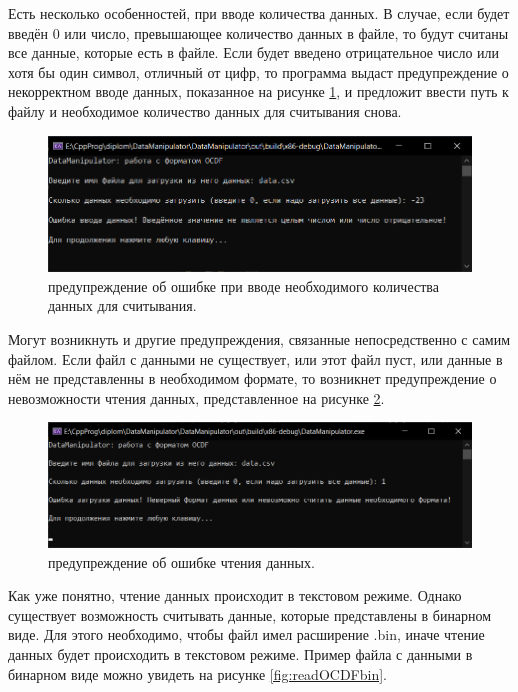 {  \par Есть несколько особенностей, при вводе количества данных. В случае, если будет введён 0 или число, превышающее количество данных в файле, то будут считаны все данные, которые есть в файле. Если будет введено отрицательное число или хотя бы один символ, отличный от цифр, то программа выдаст предупреждение о некорректном вводе данных, показанное на рисунке \ref{fig:readOCDFerror1}, и предложит ввести путь к файлу и необходимое количество данных для считывания снова. 

  \begin{figure}[H]
    \centering
    \includegraphics[width=\textwidth]{images/forDataManipulator/readOCDFerror1.png}
    \caption{предупреждение об ошибке при вводе необходимого количества данных для считывания.}
    \label{fig:readOCDFerror1}
  \end{figure}

  \par Могут возникнуть и другие предупреждения, связанные непосредственно с самим файлом. Если файл с данными не существует, или этот файл пуст, или данные в нём не представленны в необходимом формате, то возникнет предупреждение о невозможности чтения данных, представленное на рисунке \ref{fig:readOCDFerror2}.

  \begin{figure}[H]
    \centering
    \includegraphics[width=\textwidth]{images/forDataManipulator/readOCDFerror2.png}
    \caption{предупреждение об ошибке чтения данных.} 
    \label{fig:readOCDFerror2}
  \end{figure}

  \par Как уже понятно, чтение данных происходит в текстовом режиме. Однако существует возможность считывать данные, которые представлены в бинарном виде. Для этого необходимо, чтобы файл имел расширение .bin, иначе чтение данных будет происходить в текстовом режиме. Пример файла с данными в бинарном виде можно увидеть на рисунке \ref{fig:readOCDFbin}.

}
